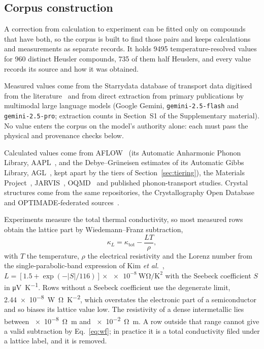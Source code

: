 \subsection{Corpus construction}
\label{sec:dataset}

A correction from calculation to experiment can be fitted only on compounds that have both, so the
corpus is built to find those pairs and keeps calculations and measurements as separate records. It
holds \num{9495} temperature-resolved values for \num{960} distinct Heusler compounds, \num{735} of
them half Heuslers, and every value records its source and how it was obtained.

Measured values come from the Starrydata database of transport data digitised from the
literature~\cite{katsura2025starrydata} and from direct extraction from primary publications by
multimodal large language models (Google Gemini, \texttt{gemini-2.5-flash} and
\texttt{gemini-2.5-pro}; extraction counts in Section~S1 of the Supplementary material). No value enters the corpus on the model's authority alone: each must pass
the physical and provenance checks below.

Calculated values come from AFLOW~\cite{curtarolo2012aflow} (its Automatic Anharmonic Phonon Library,
AAPL~\cite{plata2017an}, and the Debye--Gr\"{u}neisen estimates of its Automatic Gibbs Library,
AGL~\cite{toher2014highthroug},
kept apart by the tiers of Section~\ref{sec:tiering}), the Materials
Project~\cite{jain2013commentary}, JARVIS~\cite{choudhary2020the}, OQMD~\cite{kirklin2015the} and
published phonon-transport studies. Crystal structures come from the same repositories, the
Crystallography Open Database~\cite{graulis2009crystallog} and OPTIMADE-federated
sources~\cite{andersen2021optimade}.

Experiments measure the total thermal conductivity, so most measured rows obtain the lattice part by
Wiedemann--Franz subtraction,
%
\begin{equation}
  \kappa_L = \kappa_\mathrm{tot} - \frac{L T}{\rho},
  \label{eq:wf}
\end{equation}
%
with $T$ the temperature, $\rho$ the electrical resistivity and the Lorenz number from the
single-parabolic-band expression of Kim \emph{et al.}~\cite{kim2015characteri},
$L = [1.5 + \exp(-|S|/116)]\times\SI{e-8}{\watt\ohm\per\kelvin\squared}$ with the Seebeck coefficient
$S$ in \si{\micro\volt\per\kelvin}. Rows without a Seebeck coefficient use the degenerate limit,
\SI{2.44e-8}{\watt\ohm\per\kelvin\squared}, which overstates the electronic part of a semiconductor
and so biases its lattice value low. The resistivity of a dense intermetallic lies between
\SI{e-8}{\ohm\meter} and \SI{e-2}{\ohm\meter}. A row outside that range cannot give a valid
subtraction by Eq.~\eqref{eq:wf}; in practice it is a total conductivity filed under a lattice
label, and it is removed.

